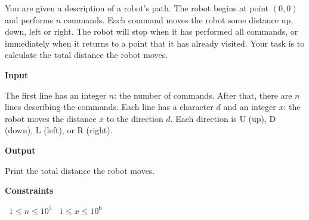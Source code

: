 You are given a description of a robot's path. The robot begins at point $(0,0)$ and performs $n$ commands. Each command moves the robot some distance up, down, left or right.
The robot will stop when it has performed all commands, or immediately when it returns to a point that it has already visited. Your task is to calculate the total distance the robot moves.

\vspace{0.3cm}\noindent\textbf{Input}

The first line has an integer $n$: the number of commands.
After that, there are $n$ lines describing the commands. Each line has a character $d$ and an integer $x$: the robot moves the distance  $x$ to the direction $d$. Each direction is U (up), D (down), L (left), or R (right).

\vspace{0.3cm}\noindent\textbf{Output}

Print the total distance the robot moves.

\vspace{0.3cm}\noindent\textbf{Constraints}

\textbullet\ $1 \le n \le 10^5$
\textbullet\ $1 \le x \le 10^6$